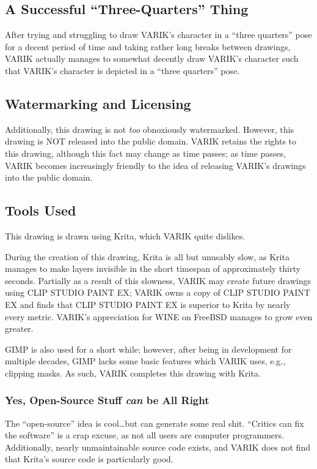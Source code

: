 \documentclass{report}
\begin{document}
\subsection{A Successful ``Three-Quarters'' Thing}
After trying and struggling to draw VARIK's character in a ``three quarters'' pose for a decent period of time and taking rather long breaks between drawings, VARIK actually manages to somewhat decently draw VARIK's character such that VARIK's character is depicted in a ``three quarters'' pose.
\subsection{Watermarking and Licensing}
Additionally, this drawing is not \textit{too} obnoxiously watermarked.  However, this drawing is NOT released into the public domain.  VARIK retains the rights to this drawing, although this fact may change as time passes; as time passes, VARIK becomes increasingly friendly to the idea of releasing VARIK's drawings into the public domain.
\subsection{Tools Used}
This drawing is drawn using Krita, which VARIK quite dislikes.

During the creation of this drawing, Krita is all but unusably slow, as Krita manages to make layers invisible in the short timespan of approximately thirty seconds.  Partially as a result of this slowness, VARIK may create future drawings using CLIP STUDIO PAINT EX; VARIK owns a copy of CLIP STUDIO PAINT EX and finds that CLIP STUDIO PAINT EX is superior to Krita by nearly every metric.  VARIK's appreciation for WINE on FreeBSD manages to grow even greater.

GIMP is also used for a short while; however, after being in development for multiple decades, GIMP lacks some basic features which VARIK uses, e.g., clipping masks.  As such, VARIK completes this drawing with Krita.
\subsubsection{Yes, Open-Source Stuff \textit{can} be All Right}
The ``open-source'' idea is cool\ldots but can generate some real shit.  ``Critics can fix the software'' is a crap excuse, as not all users are computer programmers.  Additionally, nearly unmaintainable source code exists, and VARIK does not find that Krita's source code is particularly good.
\end{document}
